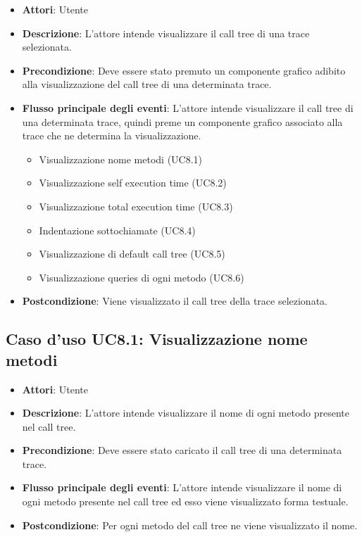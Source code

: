 \begin{itemize}
\item \textbf{Attori}: Utente
\item \textbf{Descrizione}: L'attore intende visualizzare il call tree di una trace selezionata.
\item \textbf{Precondizione}: Deve essere stato premuto un componente grafico adibito alla visualizzazione del call tree di una determinata trace.
\item \textbf{Flusso principale degli eventi}: L'attore intende visualizzare il call tree di una determinata trace, quindi preme un componente grafico associato alla trace che ne determina la visualizzazione.
\begin{itemize}
\item Visualizzazione nome metodi (UC8.1)
\item Visualizzazione self execution time (UC8.2)
\item Visualizzazione total execution time (UC8.3)
\item Indentazione sottochiamate (UC8.4)
\item Visualizzazione di default call tree (UC8.5)
\item Visualizzazione queries di ogni metodo (UC8.6)
\end{itemize}
\item \textbf{Postcondizione}: Viene visualizzato il call tree della trace selezionata.
\end{itemize}
\subsection{Caso d'uso UC8.1: Visualizzazione nome metodi}
\begin{itemize}
\item \textbf{Attori}: Utente
\item \textbf{Descrizione}: L'attore intende visualizzare il nome di ogni metodo presente nel call tree.
\item \textbf{Precondizione}: Deve essere stato caricato il call tree di una determinata trace.
\item \textbf{Flusso principale degli eventi}: L'attore intende visualizzare il nome di ogni metodo presente nel call tree ed esso viene visualizzato forma testuale.
\item \textbf{Postcondizione}: Per ogni metodo del call tree ne viene visualizzato il nome.
\end{itemize}
